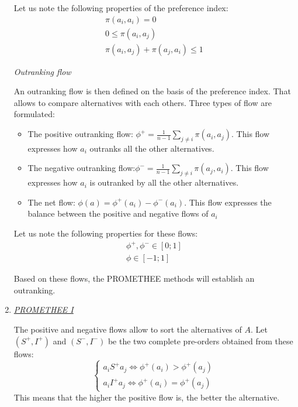 \begin{enumerate}
Let us note the following properties of the preference index:
\begin{eqnarray}
&\pi(a_i,a_i) = 0&\\
&0 \leq \pi(a_i,a_j)&\\
&\pi(a_i, a_j) + \pi(a_j,a_i) \leq 1&
\end{eqnarray}

\textit{Outranking flow}

An \og outranking flow \fg is then defined on the basis of the preference index. That allows to compare alternatives with each others. Three types of flow are formulated:
\begin{itemize}
\item The positive outranking flow: $\phi^{+} = \frac{1}{n-1} \sum_{j \neq i} \pi (a_i, a_j)$. This flow expresses how $a_i$ outranks all the other alternatives.
\item The negative outranking flow:$\phi^{-} = \frac{1}{n-1} \sum_{j \neq i} \pi (a_j, a_i)$. This flow expresses how $a_i$ is outranked by all the other alternatives.
\item The net flow: $\phi(a) = \phi^{+}(a_i) - \phi^{-}(a_i)$. This flow expresses the balance between the positive and negative flows of $a_i$
\end{itemize}
Let us note the following properties for these flows:
\begin{eqnarray}
&\phi^{+}, \phi^{-} \in [0;1]&\\
&\phi \in [-1;1]&
\end{eqnarray}

Based on these flows, the PROMETHEE methods will establish an outranking.

\item \textit{\underline{PROMETHEE I}}

The positive and negative flows allow to sort the alternatives of $A$. Let $(S^{+}, I^{+})$ and $(S^{-}, I^{-})$ be the two complete pre-orders obtained from these flows:
\begin{equation}
\begin{cases}
a_iS^{+}a_j \Leftrightarrow \phi^{+}(a_i) > \phi^{+}(a_j)\\
a_iI^{+}a_j \Leftrightarrow \phi^{+}(a_i) = \phi^{+}(a_j)
\end{cases}
\end{equation}
This means that the higher the positive flow is, the better the alternative.


\end{enumerate}

